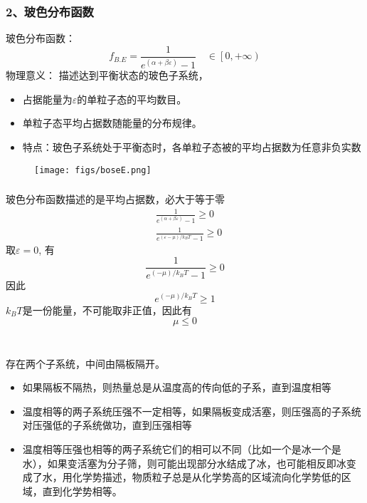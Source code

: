 \begin{frame}
  \frametitle{ 2、玻色分布函数}
  \begin{minipage}[b]{0.49\textwidth}
  \alert{玻色分布函数：} 
  \[f_{B.E} =  \frac{1}{e^{(\alpha +\beta \varepsilon)}-1} \quad \in \left[0,+\infty\right)\]
    \alert{物理意义：} 描述达到平衡状态的玻色子系统，
    \begin{itemize}
      \item 占据能量为$\varepsilon$的单粒子态的平均数目。
      \item 单粒子态平均占据数随能量的分布规律。
      \item 特点：玻色子系统处于平衡态时，各单粒子态被的平均占据数为任意非负实数
    \end{itemize}
    \end{minipage} 
    \begin{minipage}[b]{0.49\textwidth}
      \begin{figure}[htbp]
        \centering
        \texttt{[image: figs/boseE.png]}
      \end{figure}
      \end{minipage}
\end{frame}  

\begin{frame}
  \frametitle{}
  \证  玻色分布函数描述的是平均占据数，必大于等于零
  \[ \begin{aligned}
    & \frac{1}{e^{(\alpha +\beta \varepsilon)}-1} \ge 0 \\
    &  \frac{1}{e^{(\varepsilon -\mu)/k_B T}-1} \ge 0 
  \end{aligned}\]
  取$\varepsilon =0$, 有 
  \[\frac{1}{e^{( -\mu)/k_B T}-1} \ge 0 \]
  因此
  \[ e^{( -\mu)/k_B T} \ge 1 \]
  $k_B T$是一份能量，不可能取非正值，因此有
  \[ \mu \le 0\]
\end{frame} 

\begin{frame}
  \frametitle{}
  \emf[讨论-1：化学势] \\
   存在两个子系统，中间由隔板隔开。
  \begin{itemize}
    \item 如果隔板不隔热，则热量总是从温度高的传向低的子系，直到温度相等
    \item 温度相等的两子系统压强不一定相等，如果隔板变成活塞，则压强高的子系统对压强低的子系统做功，直到压强相等
    \item 温度相等压强也相等的两子系统它们的相可以不同（比如一个是冰一个是水），如果变活塞为分子筛，则可能出现部分水结成了冰，也可能相反即冰变成了水，用化学势描述，物质粒子总是从化学势高的区域流向化学势低的区域，直到化学势相等。
  \end{itemize}
\end{frame} 

